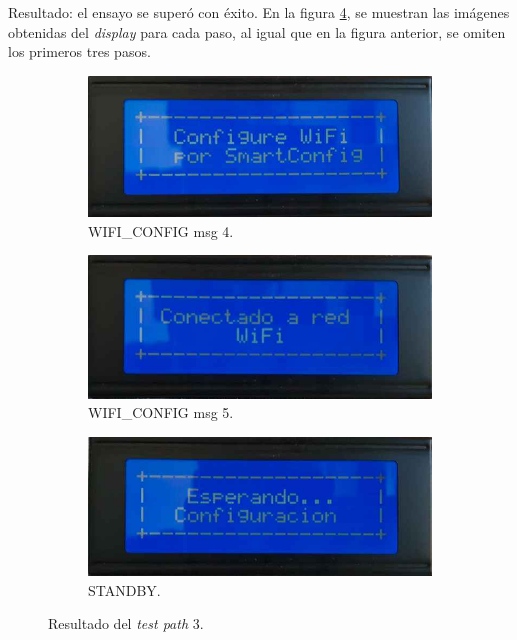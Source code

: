 \pagebreak
Resultado: el ensayo se superó con éxito. En la figura \ref{fig:pruIni_3_res}, se muestran las imágenes obtenidas del \textit{display} para cada paso, al igual que en la figura anterior, se omiten los primeros tres pasos. 

\begin{figure}[!htpb]
     \centering
     \begin{subfigure}[b]{0.4\textwidth}
         \centering
         \includegraphics[width=1.1\textwidth]{./Figures/Conf_SmartConf.jpeg}
         \caption{WIFI\_CONFIG msg 4.}
         \label{fig:pruIni_3_1}
     \end{subfigure}
           \hfill
     \begin{subfigure}[b]{0.4\textwidth}
         \centering
         \includegraphics[width=1.1\textwidth]{./Figures/Conect_to_WiFi.jpeg}
         \caption{WIFI\_CONFIG msg 5.}
         \label{fig:pruIni_3_2}
     \end{subfigure}
           \hfill
     \begin{subfigure}[b]{0.4\textwidth}
         \centering
         \includegraphics[width=1.1\textwidth]{./Figures/Esp_Conf.jpeg}
         \caption{STANDBY.}
         \label{fig:pruIni_3_3}
     \end{subfigure}
        \caption{Resultado del \textit{test path} 3.}
        \label{fig:pruIni_3_res}
\end{figure}

